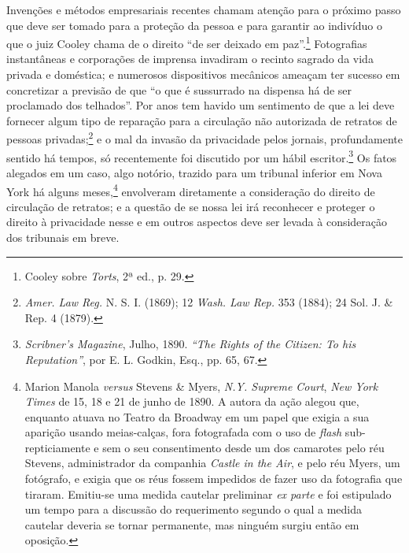 Invenções e métodos empresariais recentes chamam atenção para o próximo
passo que deve ser tomado para a proteção da pessoa e para garantir ao
indivíduo o que o juiz Cooley chama de o direito ``de ser deixado em
paz''.\footnote{Cooley sobre \emph{Torts}, 2ª ed., p. 29.} Fotografias
instantâneas e corporações de imprensa invadiram o recinto sagrado da
vida privada e doméstica; e numerosos dispositivos mecânicos ameaçam ter
sucesso em concretizar a previsão de que ``o que é sussurrado na
dispensa há de ser proclamado dos telhados''. Por anos tem havido um
sentimento de que a lei deve fornecer algum tipo de reparação para a
circulação não autorizada de retratos de pessoas privadas;\footnote{\emph{Amer.
  Law Reg.} N. S. I. (1869); 12 \emph{Wash. Law Rep.} 353 (1884); 24
  Sol. J. \& Rep. 4 (1879).} e o mal da invasão da privacidade pelos
jornais, profundamente sentido há tempos, só recentemente foi discutido
por um hábil escritor.\footnote{\emph{Scribner's Magazine}, Julho, 1890.
  \emph{``The Rights of the Citizen: To his Reputation''}, por E. L.
  Godkin, Esq., pp. 65, 67.} Os fatos alegados em um caso, algo notório,
trazido para um tribunal inferior em Nova York há alguns
meses,\footnote{Marion Manola \emph{versus} Stevens \& Myers, \emph{N.Y.
  Supreme Court}, \emph{New York Times} de 15, 18 e 21 de junho de 1890.
  A autora da ação alegou que, enquanto atuava no Teatro da Broadway em
  um papel que exigia a sua aparição usando meias-calças, fora
  fotografada com o uso de \emph{flash} sub-repticiamente e sem o seu
  consentimento desde um dos camarotes pelo réu Stevens, administrador
  da companhia \emph{Castle in the Air}, e pelo réu Myers, um fotógrafo,
  e exigia que os réus fossem impedidos de fazer uso da fotografia que
  tiraram. Emitiu-se uma medida cautelar preliminar \emph{ex parte} e
  foi estipulado um tempo para a discussão do requerimento segundo o
  qual a medida cautelar deveria se tornar permanente, mas ninguém
  surgiu então em oposição.} envolveram diretamente a consideração do
direito de circulação de retratos; e a questão de se nossa lei irá
reconhecer e proteger o direito à privacidade nesse e em outros aspectos
deve ser levada à consideração dos tribunais em breve.

